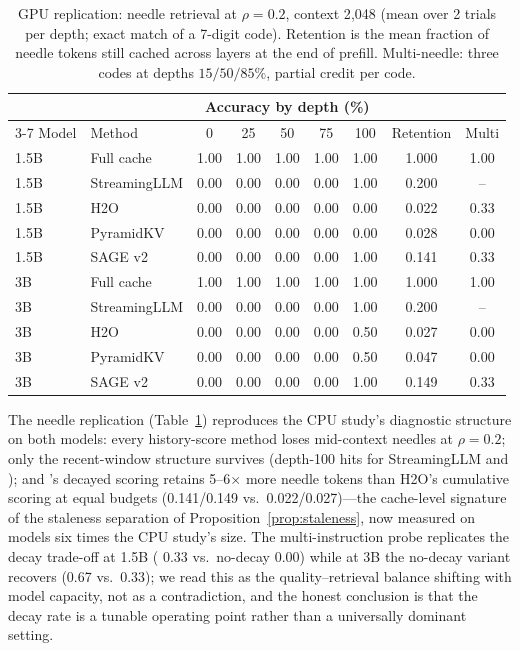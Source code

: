 \begin{table}[t]
\centering\small
\caption{GPU replication: needle retrieval at $\rho=0.2$, context
2{,}048 (mean over 2 trials per depth; exact match of a 7-digit code).
Retention is the mean fraction of needle tokens still cached across
layers at the end of prefill. Multi-needle: three codes at depths
$15/50/85\%$, partial credit per code.}
\label{tab:gpuneedle}
\begin{tabular*}{\columnwidth}{@{\extracolsep{\fill}} ll ccccc c c}
\toprule
& & \multicolumn{5}{c}{Accuracy by depth (\%)} & & \\
\cmidrule(lr){3-7}
Model & Method & 0 & 25 & 50 & 75 & 100 & Retention & Multi \\
\midrule
1.5B & Full cache & 1.00 & 1.00 & 1.00 & 1.00 & 1.00 & 1.000 & 1.00 \\
1.5B & StreamingLLM & 0.00 & 0.00 & 0.00 & 0.00 & 1.00 & 0.200 & -- \\
1.5B & H2O & 0.00 & 0.00 & 0.00 & 0.00 & 0.00 & 0.022 & 0.33 \\
1.5B & PyramidKV & 0.00 & 0.00 & 0.00 & 0.00 & 0.00 & 0.028 & 0.00 \\
1.5B & SAGE v2 & 0.00 & 0.00 & 0.00 & 0.00 & 1.00 & 0.141 & 0.33 \\
\midrule
3B & Full cache & 1.00 & 1.00 & 1.00 & 1.00 & 1.00 & 1.000 & 1.00 \\
3B & StreamingLLM & 0.00 & 0.00 & 0.00 & 0.00 & 1.00 & 0.200 & -- \\
3B & H2O & 0.00 & 0.00 & 0.00 & 0.00 & 0.50 & 0.027 & 0.00 \\
3B & PyramidKV & 0.00 & 0.00 & 0.00 & 0.00 & 0.50 & 0.047 & 0.00 \\
3B & SAGE v2 & 0.00 & 0.00 & 0.00 & 0.00 & 1.00 & 0.149 & 0.33 \\
\bottomrule
\end{tabular*}
\end{table}

The needle replication (Table~\ref{tab:gpuneedle}) reproduces the CPU
study's diagnostic structure on both models: every history-score method
loses mid-context needles at $\rho=0.2$; only the recent-window
structure survives (depth-100 hits for StreamingLLM and \sage{}); and
\sage's decayed scoring retains 5--6$\times$ more needle tokens than
H2O's cumulative scoring at equal budgets (0.141/0.149 vs.\
0.022/0.027)---the cache-level signature of the staleness separation of
Proposition~\ref{prop:staleness}, now measured on models six times the
CPU study's size. The multi-instruction probe replicates the decay
trade-off at 1.5B (\sage{} 0.33 vs.\ no-decay 0.00) while at 3B the
no-decay variant recovers (0.67 vs.\ 0.33); we read this as the
quality--retrieval balance shifting with model capacity, not as a
contradiction, and the honest conclusion is that the decay rate is a
tunable operating point rather than a universally dominant setting.

